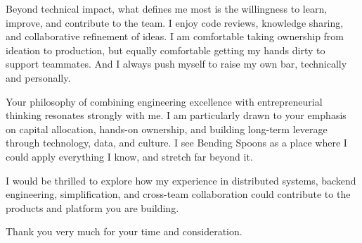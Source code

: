 \documentclass[11pt,a4paper,sans]{moderncv}
\begin{document}
\begin{justify}
Beyond technical impact, what defines me most is the willingness to learn, improve, and contribute to the team. I enjoy code reviews, knowledge sharing, and collaborative refinement of ideas. I am comfortable taking ownership from ideation to production, but equally comfortable getting my hands dirty to support teammates. And I always push myself to raise my own bar, technically and personally.

Your philosophy of combining engineering excellence with entrepreneurial thinking resonates strongly with me. I am particularly drawn to your emphasis on capital allocation, hands-on ownership, and building long-term leverage through technology, data, and culture. I see Bending Spoons as a place where I could apply everything I know, and stretch far beyond it.

I would be thrilled to explore how my experience in distributed systems, backend engineering, simplification, and cross-team collaboration could contribute to the products and platform you are building.

Thank you very much for your time and consideration.
\end{justify}

\makeletterclosing
\end{document}
